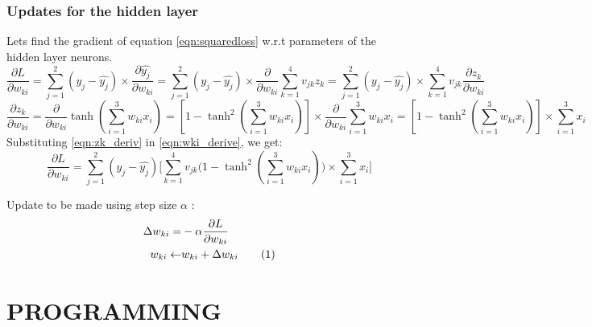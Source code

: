 \documentclass[a4paper,doc,notimes]{article}
\newcommand\numberthis{\addtocounter{equation}{1}\tag{\theequation}}
\begin{document}
\subsubsection{Updates for the hidden layer}
Lets find the gradient of equation \ref{eqn:squaredloss} w.r.t parameters of the hidden layer neurons.
\begin{equation}\label{eqn:wki_derive}
\frac{\partial L}{\partial w_{ki}} = \sum_{j=1}^{2}(y_j - \hat{y_j}) \times \frac{\partial \hat{y_j}}{\partial w_{ki}} = \sum_{j=1}^{2}(y_j - \hat{y_j}) \times \frac{\partial }{\partial w_{ki}} \sum_{k=1}^{4} v_{jk}z_k  = \sum_{j=1}^{2}(y_j - \hat{y_j}) \times \sum_{k=1}^{4} v_{jk}  \frac{\partial z_k}{\partial w_{ki}} 
\end{equation}
\begin{equation} \label{eqn:zk_deriv}
\frac{\partial z_k}{\partial w_{ki}} = \frac{\partial }{\partial w_{ki}}  \tanh(\sum_{i=1}^{3} w_{ki}x_i) = [ 1 - \tanh^2(\sum_{i=1}^{3} w_{ki}x_i)] \times  \frac{\partial }{\partial w_{ki}} \sum_{i=1}^{3} w_{ki}x_i = [ 1 - \tanh^2(\sum_{i=1}^{3} w_{ki}x_i)] \times   \sum_{i=1}^{3} x_i  
\end{equation}
Substituting \ref{eqn:zk_deriv} in \ref{eqn:wki_derive}, we get: 
\begin{equation}\label{eqn:wki_derive2}
\frac{\partial L}{\partial w_{ki}} = \sum_{j=1}^{2}(y_j - \hat{y_j}) \bigg[ \sum_{k=1}^{4} v_{jk} \big( 1 - \tanh^2(\sum_{i=1}^{3} w_{ki}x_i) \big)\times   \sum_{i=1}^{3} x_i  \bigg]
\end{equation}

Update to be made using step size $\alpha$ : 
\begin{align*}
\Delta w_{ki}  = & - \alpha \frac{\partial L}{\partial w_{ki}} \\
w_{ki} \leftarrow &  w_{ki}  + \Delta w_{ki} \numberthis
\end{align*}


\section{PROGRAMMING}
\subsection{}
\end{document}

